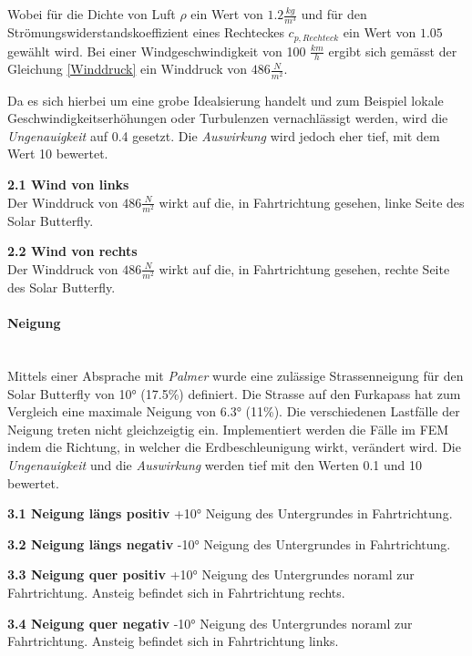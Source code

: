   Wobei für die Dichte von Luft $\rho$ ein Wert von $1.2 \frac{kg}{m^3}$ und für den Strömungswiderstandskoeffizient eines Rechteckes $c_{p,Rechteck}$ ein Wert von $1.05$ gewählt wird. Bei einer Windgeschwindigkeit von 100 $\frac{km}{h}$ ergibt sich gemässt der Gleichung \ref{Winddruck} ein Winddruck von $486 \frac{N}{m^2}$.

  Da es sich hierbei um eine grobe Idealsierung handelt und zum Beispiel lokale Geschwindigkeitserhöhungen oder Turbulenzen vernachlässigt werden, wird die \emph{Ungenauigkeit} auf 0.4 gesetzt. Die \emph{Auswirkung} wird jedoch eher tief, mit dem Wert 10 bewertet.

  \begin{description}
    \item \textbf{2.1 Wind von links}\\ Der Winddruck von $486 \frac{N}{m^2}$ wirkt auf die, in Fahrtrichtung gesehen, linke Seite des Solar Butterfly.
    \item \textbf{2.2 Wind von rechts}\\ Der Winddruck von $486 \frac{N}{m^2}$ wirkt auf die, in Fahrtrichtung gesehen, rechte Seite des Solar Butterfly.
  \end{description}

  \paragraph{Neigung}\mbox{}\\
  Mittels einer Absprache mit \emph{Palmer} wurde eine zulässige Strassenneigung für den Solar Butterfly von 10° (17.5\%) definiert. Die Strasse auf den Furkapass hat zum Vergleich eine maximale Neigung von 6.3° (11\%). Die verschiedenen Lastfälle der Neigung treten nicht gleichzeigtig ein. Implementiert werden die Fälle im FEM indem die Richtung, in welcher die Erdbeschleunigung wirkt, verändert wird. Die \emph{Ungenauigkeit} und die \emph{Auswirkung} werden tief mit den Werten 0.1  und 10 bewertet.

  \begin{description}
    \item \textbf{3.1 Neigung längs positiv} +10° Neigung des Untergrundes in Fahrtrichtung.
    \item \textbf{3.2 Neigung längs negativ} -10° Neigung des Untergrundes in Fahrtrichtung.
    \item \textbf{3.3 Neigung quer positiv} +10° Neigung des Untergrundes noraml zur Fahrtrichtung. Ansteig befindet sich in Fahrtrichtung rechts.
    \item \textbf{3.4 Neigung quer negativ} -10° Neigung des Untergrundes noraml zur Fahrtrichtung. Ansteig befindet sich in Fahrtrichtung links.
  \end{description}

